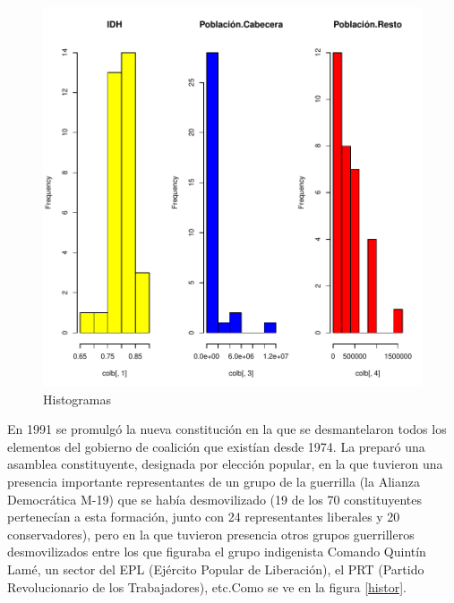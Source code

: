 \documentclass{article}
\begin{document}
\begin{figure}[h]
\centering

\includegraphics{proyecto1-barplots}
\caption{Histogramas}
\label{hist}
\end{figure}
En 1991 se promulgó la nueva constitución en la que se desmantelaron todos los elementos del gobierno de coalición que existían desde 1974\cite{reynolds_clustering_2006}. La preparó una asamblea constituyente, designada por elección popular, en la que tuvieron una presencia importante representantes de un grupo de la guerrilla (la Alianza Democrática M-19) que se había desmovilizado (19 de los 70 constituyentes pertenecían a esta formación, junto con 24 representantes liberales y 20 conservadores), pero en la que tuvieron presencia otros grupos guerrilleros desmovilizados entre los que figuraba el grupo indigenista Comando Quintín Lamé, un sector del EPL (Ejército Popular de Liberación), el PRT (Partido Revolucionario de los Trabajadores), etc.Como se ve en la figura \ref{histor}.
\end{document}
